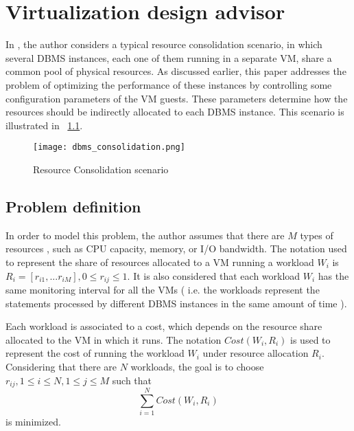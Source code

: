 \chapter{Virtualization design advisor}

\label{chap:virtualization}


In \cite{Soror:2008:AVM:1376616.1376711}, the author considers a typical resource consolidation scenario, in which several DBMS instances, each one of them running in a separate VM, share a common pool of physical resources. As discussed earlier, this paper addresses the problem of optimizing the performance of these instances by controlling some configuration parameters of the VM guests. These parameters determine how the resources should be indirectly allocated to each DBMS instance. This scenario is illustrated in ~\ref{fig:scenario}.


\begin{figure}[ht]
\centering
\texttt{[image: dbms\_consolidation.png]}
\caption{Resource Consolidation scenario}
\label{fig:scenario}
\end{figure} 

\section{Problem definition}

In order to model this problem, the author assumes that there are  $M$ types of resources , such as CPU capacity, memory, or I/O bandwidth. The notation used to represent the share of resources allocated to a VM running a workload $W_{i}$ is $R_{i} = [r_{i1},...r_{iM}], 0 \leq r_{ij} \leq 1$. It is also considered that each workload $W_{i}$ has the same monitoring interval for all the VMs ( i.e. the workloads represent the statements processed by different DBMS instances in the same amount of time ).

Each workload is associated to a cost, which depends on the resource share allocated to the VM in which it runs. The notation $Cost(W_{i},R_{i})$ is used to represent the cost of running the workload $W_{i}$ under resource allocation $R_{i}$. Considering that there are $N$ workloads, the goal is to choose $r_{ij}, 1 \leq i \leq N, 1 \leq j \leq M$ such that 
\[
  \sum_{i=1}^{N} Cost(W_{i},R_{i})
\]
is minimized.

